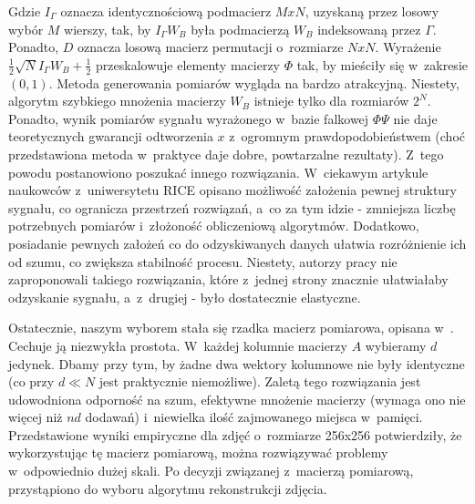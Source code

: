 Gdzie $I_\Gamma$ oznacza identycznościową podmacierz $M x N$, uzyskaną przez losowy wybór $M$ wierszy, tak, by $I_\Gamma W_B$ była podmacierzą $W_B$ indeksowaną przez $\Gamma$. Ponadto, $D$ oznacza losową macierz permutacji o~rozmiarze $N x N$. Wyrażenie $\frac{1}{2} \sqrt{N} I_\Gamma W_B + \frac{1}{2}$ przeskalowuje elementy macierzy $\Phi$ tak, by mieściły się w~zakresie $(0,1)$. Metoda generowania pomiarów wygląda na bardzo atrakcyjną. Niestety, algorytm szybkiego mnożenia macierzy $W_B$ istnieje tylko dla rozmiarów $2^N$. Ponadto, wynik pomiarów sygnału wyrażonego w~bazie falkowej $\Phi \Psi$ nie daje teoretycznych gwarancji odtworzenia $x$ z~ogromnym prawdopodobieństwem (choć przedstawiona metoda w~praktyce daje dobre, powtarzalne rezultaty). Z~tego powodu postanowiono poszukać innego rozwiązania. W~ciekawym artykule naukowców z~uniwersytetu RICE \cite{Baraniuk2010} opisano możliwość założenia pewnej struktury sygnału, co ogranicza przestrzeń rozwiązań, a~co za tym idzie - zmniejsza liczbę potrzebnych pomiarów i~złożoność obliczeniową algorytmów. Dodatkowo, posiadanie pewnych założeń co do odzyskiwanych danych ułatwia rozróżnienie ich od szumu, co zwiększa stabilność procesu. Niestety, autorzy pracy nie zaproponowali takiego rozwiązania, które z~jednej strony znacznie ułatwiałaby odzyskanie sygnału, a~z~drugiej - było dostatecznie elastyczne. 

Ostatecznie, naszym wyborem stała się rzadka macierz pomiarowa, opisana w~\cite{Berinde2008}. Cechuje ją niezwykła prostota. W~każdej kolumnie macierzy $A$ wybieramy $d$ jedynek. Dbamy przy tym, by żadne dwa wektory kolumnowe nie były identyczne (co przy $d \ll N$ jest praktycznie niemożliwe). Zaletą tego rozwiązania jest udowodniona odporność na szum, efektywne mnożenie macierzy (wymaga ono nie więcej niż $nd$ dodawań) i~niewielka ilość zajmowanego miejsca w~pamięci. Przedstawione wyniki empiryczne dla zdjęć o~rozmiarze 256x256 potwierdziły, że wykorzystując tę macierz pomiarową, można rozwiązywać problemy w~odpowiednio dużej skali. Po decyzji związanej z~macierzą pomiarową, przystąpiono do wyboru algorytmu rekonstrukcji zdjęcia.

